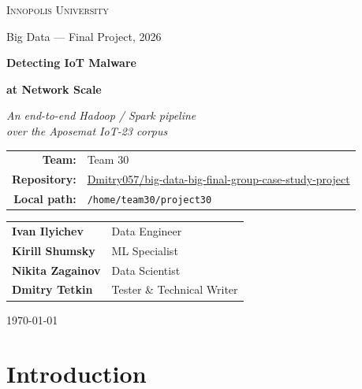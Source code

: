 \documentclass[11pt,a4paper]{article}
\begin{document}
\begin{titlepage}
    \centering
    \vspace*{2cm}
    {\large\textsc{Innopolis University}\par}
    \vspace{0.3cm}
    {\large Big Data --- Final Project, 2026\par}
    \vspace{4cm}

    {\Huge\bfseries Detecting IoT Malware\par}
    \vspace{0.4cm}
    {\Huge\bfseries at Network Scale\par}
    \vspace{0.6cm}
    {\Large\itshape An end-to-end Hadoop / Spark pipeline\\
    over the Aposemat IoT-23 corpus\par}
    \vspace{4cm}

    \begin{tabular}{rl}
        \textbf{Team:} & Team 30 \\
        \textbf{Repository:} & \href{https://github.com/Dmitry057/big-data-big-final-group-case-study-project}{Dmitry057/big-data-big-final-group-case-study-project} \\
        \textbf{Local path:} & \texttt{/home/team30/project30} \\
    \end{tabular}

    \vspace{2cm}

    \begin{tabular}{ll}
        \textbf{Ivan Ilyichev} & Data Engineer \\
        \textbf{Kirill Shumsky} & ML Specialist \\
        \textbf{Nikita Zagainov} & Data Scientist \\
        \textbf{Dmitry Tetkin} & Tester \& Technical Writer \\
    \end{tabular}

    \vfill
    \today
\end{titlepage}

\section{Introduction}
\end{document}
